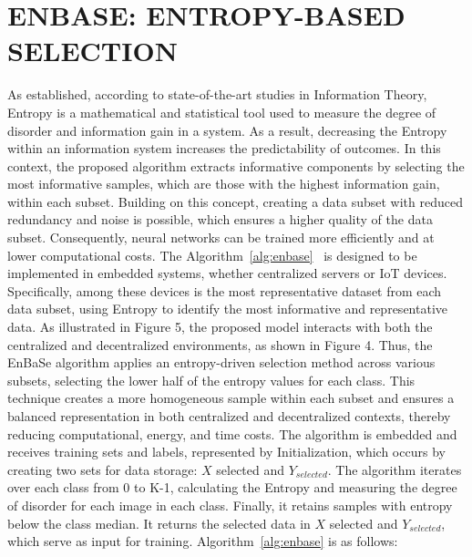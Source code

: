 \documentclass[11pt,a4paper]{article}
\begin{document}
\section{ENBASE: ENTROPY-BASED SELECTION}
As established, according to state-of-the-art studies in Information Theory, Entropy is a mathematical and statistical tool used to measure the degree of disorder and information gain in a system.
As a result, decreasing the Entropy within an information system increases the predictability of outcomes.
In this context, the proposed algorithm extracts informative components by selecting the most informative samples, which are those with the highest information gain, within each subset.
Building on this concept, creating a data subset with reduced redundancy and noise is possible, which ensures a higher quality of the data subset.
Consequently, neural networks can be trained more efficiently and at lower computational costs.
The Algorithm~\ref{alg:enbase}~\citep{neto2025Enbase,neto2025Adding} is designed to be implemented in embedded systems, whether centralized servers or IoT devices.
Specifically, among these devices is the most representative dataset from each data subset, using Entropy to identify the most informative and representative data.
As illustrated in Figure 5, the proposed model interacts with both the centralized and decentralized environments, as shown in Figure 4.
Thus, the EnBaSe algorithm applies an entropy-driven selection method across various subsets, selecting the lower half of the entropy values for each class.
This technique creates a more homogeneous sample within each subset and ensures a balanced representation in both centralized and decentralized contexts, thereby reducing computational, energy, and time costs.
The algorithm is embedded and receives training sets and labels, represented by Initialization, which occurs by creating two sets for data storage: $X$ selected and $Y_{selected}$.
The algorithm iterates over each class from 0 to K-1, calculating the Entropy and measuring the degree of disorder for each image in each class.
Finally, it retains samples with entropy below the class median.
It returns the selected data in $X$ selected and $Y_{selected}$, which serve as input for training.
Algorithm~\ref{alg:enbase} is as follows:
\end{document}
